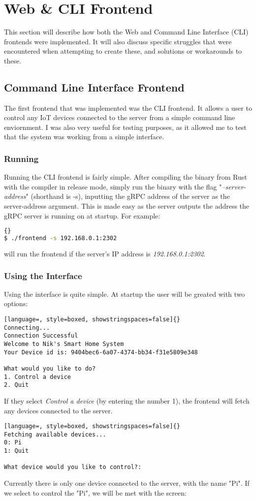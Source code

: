 \section{Web \& CLI Frontend} \label{sec:chapimpl:frontend}
This section will describe how both the Web and Command Line Interface (CLI) frontends were implemented. It will also discuss specific struggles that were encountered when attempting to create these, and solutions or workarounds to these. 
\subsection{Command Line Interface Frontend} \label{sec:chapimpl:cli}
The first frontend that was implemented was the CLI frontend. It allows a user to control any IoT devices connected to the server from a simple command line enviornment. I was also very useful for testing purposes, as it allowed me to test that the system was working from a simple interface.
\subsubsection{Running}
Running the CLI frontend is fairly simple. After compiling the binary from Rust with the compiler in release mode, simply run the binary with the flag "\textit{--server-address}" (shorthand is -s), inputting the gRPC address of the server as the server-address argument. This is made easy as the server outputs the address the gRPC server is running on at startup. For example:
\begin{lstlisting}[language=Bash, style=boxed, showstringspaces=false]{}
$ ./frontend -s 192.168.0.1:2302
\end{lstlisting}
will run the frontend if the server's IP address is \textit{192.168.0.1:2302}.

\subsubsection{Using the Interface}
Using the interface is quite simple. At startup the user will be greated with two options:
\begin{lstlisting}[language=, style=boxed, showstringspaces=false]{}
Connecting...
Connection Successful
Welcome to Nik's Smart Home System
Your Device id is: 9404bec6-6a07-4374-bb34-f31e5809e348

What would you like to do?
1. Control a device
2. Quit
\end{lstlisting}
If they select \textit{Control a device} (by entering the number 1), the frontend will fetch any devices connected to the server.
\begin{lstlisting}[language=, style=boxed, showstringspaces=false]{}
Fetching available devices...
0: Pi
1: Quit

What device would you like to control?:
\end{lstlisting}
Currently there is only one device connected to the server, with the name "Pi". If we select to control the "Pi", we will be met with the screen:

